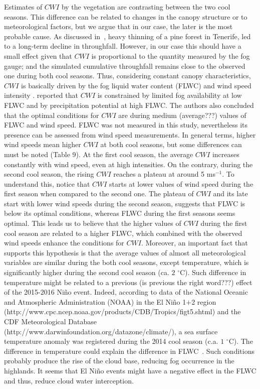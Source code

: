 \documentclass[a4paper,12pt]{article}
\begin{document}
Estimates of $CWI$ by the vegetation are contrasting between the two cool seasons. This difference can be related to changes in the canopy structure or to meteorological factors, but we argue that in our case, the later is the most probable cause. As discussed in~\cite{Aboaletal2000}, heavy thinning of a pine forest in Tenerife, led to a long-term decline in throughfall. However, in our case this should have a small effect given that $CWI$ is proportional to the quantity measured by the fog gauge; and the simulated cumulative throughfall remains close to the observed one during both cool seasons. Thus, considering constant canopy characteristics, $CWI$ is basically driven by the fog liquid water content (FLWC) and wind speed intensity \citep{Villegasetal2008}. \cite{Villegasetal2008} reported that $CWI$ is constrained by limited fog availability at low FLWC  and by precipitation potential at high FLWC. The authors also concluded that the optimal conditions for $CWI$ are during medium (average???) values of FLWC and wind speed. FLWC was not measured in this study, nevertheless its presence can be assessed from wind speed measurements. In general terms, higher wind speeds mean higher $CWI$ at both cool seasons, but some differences can must be noted (Table 9). At the first cool season, the average $CWI$ increases constantly with wind speed, even at high intensities. On the contrary, during the second cool season, the rising $CWI$ reaches a plateau at around 5 ms$^{-1}$. To understand this, notice that $CWI$ starts at lower values of wind speed during the first season when compared to the second one. The plateau of $CWI$ and its late start with lower wind speeds during the second season, suggests that FLWC is below its optimal conditions, whereas FLWC during the first seasons seems optimal. This leads us to believe that the higher values of $CWI$ during the first cool season are related to a higher FLWC, which combined with the observed wind speeds enhance the conditions for $CWI$. Moreover, an important fact that supports this hypothesis is that the average values of almost all meteorological variables  are similar during the both cool seasons, except temperature, which is significantly higher during the second cool season (ca. $2$ $\mathrm{^{\circ}C}$). Such difference in temperature might be related to a previous (is previous the right word???) effect of the 2015-2016 Niño event. Indeed, according to data of the National Oceanic and Atmospheric Administration (NOAA) in the El Niño 1$+$2 region (http://www.cpc.ncep.noaa.gov/products/CDB/Tropics/figt5.shtml) and the CDF Meteorological Database (http://www.darwinfoundation.org/datazone/climate/), a sea surface temperature anomaly was registered during the 2014 cool season (c.a. $1$ $\mathrm{^{\circ}C}$). The difference in temperature could explain the difference in FLWC~\citep{Thompson2007}. Such conditions probably produce the rise of the cloud base, reducing fog occurrence in the highlands. It seems that El Niño events might have a negative effect in the FLWC and thus, reduce cloud water interception. 
\end{document}

